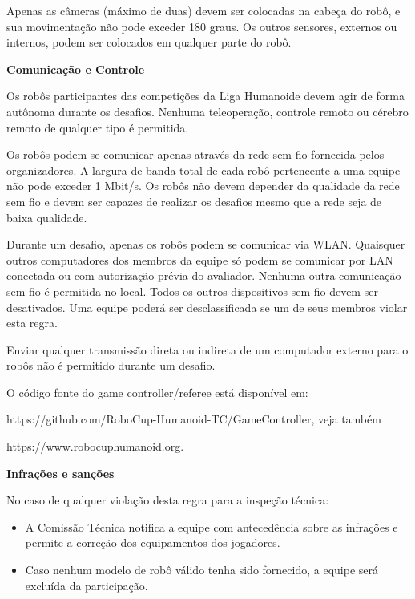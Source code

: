 Apenas as câmeras (máximo de duas) devem ser colocadas na cabeça do robô, e sua movimentação não pode exceder 180 graus. Os outros sensores, externos ou internos, podem ser colocados em qualquer parte do robô.

\bigskip

{\bfseries Comunicação e Controle}

\headlinebox

Os robôs participantes das competições da Liga Humanoide devem agir de forma autônoma durante os desafios. Nenhuma teleoperação, controle remoto ou cérebro remoto de qualquer tipo é permitida.

\bigskip

Os robôs podem se comunicar apenas através da rede sem fio fornecida pelos organizadores. A largura de banda total de cada robô pertencente a uma equipe não pode exceder 1 Mbit/s. Os robôs não devem depender da qualidade da rede sem fio e devem ser capazes de realizar os desafios mesmo que a rede seja de baixa qualidade.

Durante um desafio, apenas os robôs podem se comunicar via WLAN. Quaisquer outros computadores dos membros da equipe só podem se comunicar por LAN conectada ou com autorização prévia do avaliador. Nenhuma outra comunicação sem fio é permitida no local. Todos os outros dispositivos sem fio devem ser desativados. Uma equipe poderá ser desclassificada se um de seus membros violar esta regra.

Enviar qualquer transmissão direta ou indireta de um computador externo para o
robôs não é permitido durante um desafio.

\bigskip

O código fonte do game controller/referee está disponível em:

\textcolor[rgb]{0.0,0.0,0.49803922}{https://github.com/RoboCup-Humanoid-TC/GameController},
veja também

\textcolor[rgb]{0.0,0.0,0.49803922}{https://www.robocuphumanoid.org}.

\bigskip

{\bfseries Infrações e sanções}

\headlinebox

No caso de qualquer violação desta regra para a inspeção técnica:

\begin{itemize}
\item A Comissão Técnica notifica a equipe com antecedência sobre as infrações e permite a correção dos equipamentos dos jogadores.
\item Caso nenhum modelo de robô válido tenha sido fornecido, a equipe será excluída da participação.
\end{itemize}

